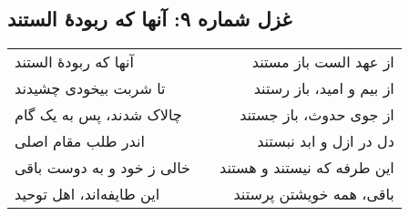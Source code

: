 \begin{center}
\section*{غزل شماره ۹: آنها که ربودهٔ الستند}
\label{sec:009}
\begin{longtable}{l p{0.5cm} r}
آنها که ربودهٔ الستند
&&
از عهد الست باز مستند
\\
تا شربت بیخودی چشیدند
&&
از بیم و امید، باز رستند
\\
چالاک شدند، پس به یک گام
&&
از جوی حدوث، باز جستند
\\
اندر طلب مقام اصلی
&&
دل در ازل و ابد نبستند
\\
خالی ز خود و به دوست باقی
&&
این طرفه که نیستند و هستند
\\
این طایفه‌اند، اهل توحید
&&
باقی، همه خویشتن پرستند
\\
\end{longtable}
\end{center}
